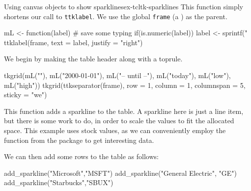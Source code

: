 \begin{example}{Using canvas objects to show sparklines}{ex-tcltk-sparklines}
This function simply shortens our call to \texttt{ttklabel}. We use
the global \texttt{frame} (a ) as the parent.
\begin{Schunk}
\begin{Sinput}
 mL <- function(label) { # save some typing
   if(is.numeric(label))
     label <- sprintf("%
   ttklabel(frame, text = label, justify = "right") 
 }
\end{Sinput}
\end{Schunk}
%
We begin by making the table header along with a toprule.
\begin{Schunk}
\begin{Sinput}
 tkgrid(mL(""), mL("2000-01-01"), mL("-- until --"), 
        mL("today"), mL("low"), mL("high"))
 tkgrid(ttkseparator(frame), row = 1, column = 1, columnspan = 5, 
        sticky = "we")
\end{Sinput}
\end{Schunk}
%
This function adds a sparkline to the table. A sparkline here is just
a line item, but there is some work to do, in order to scale the
values to fit the allocated space. This example uses stock values, as
we can conveniently employ the  function from
the  package to get interesting data.
\begin{Schunk}
\end{Schunk}

We can then add some rows to the table as follows:
\begin{Schunk}
\begin{Sinput}
 add_sparkline("Microsoft","MSFT")
 add_sparkline("General Electric", "GE")
 add_sparkline("Starbucks","SBUX")
\end{Sinput}
\end{Schunk}
\end{example}

